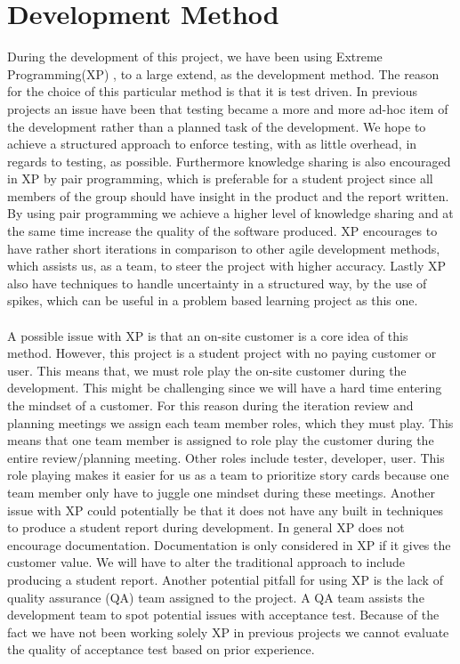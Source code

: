 
\section{Development Method}
\label{sec:development_method}

During the development of this project, we have been using Extreme Programming(XP) \parencite{xp}, to a large extend, as the development method. The reason for the choice of this particular method is that it is test driven. In previous projects an issue have been that testing became a more and more ad-hoc item of the development rather than a planned task of the development. We hope to achieve a structured approach to enforce testing, with as little overhead, in regards to testing, as possible. Furthermore knowledge sharing is also encouraged in XP by pair programming, which is preferable for a student project since all members of the group should have insight in the product and the report written. By using pair programming we achieve a higher level of knowledge sharing and at the same time increase the quality of the software produced. XP encourages to have rather short iterations in comparison to other agile development methods, which assists us, as a team, to steer the project with higher accuracy. Lastly XP also have techniques to handle uncertainty in a structured way, by the use of spikes, which can be useful in a problem based learning project as this one. 
\\\\
A possible issue with XP is that an on-site customer is a core idea of this method. However, this project is a student project with no paying customer or user. This means that, we must role play the on-site customer during the development. This might be challenging since we will have a hard time entering the mindset of a customer. For this reason during the iteration review and planning meetings we assign each team member roles, which they must play. This means that one team member is assigned to role play the customer during the entire review/planning meeting. Other roles include tester, developer, user. This role playing makes it easier for us as a team to prioritize story cards because one team member only have to juggle one mindset during these meetings. Another issue with XP could potentially be that it does not have any built in techniques to produce a student report during development. In general XP does not encourage documentation. Documentation is only considered in XP if it gives the customer value. We will have to alter the traditional approach to include producing a student report. Another potential pitfall for using XP is the lack of quality assurance (QA) team assigned to the project. A QA team assists the development team to spot potential issues with acceptance test. Because of the fact we have not been working solely XP in previous projects we cannot evaluate the quality of acceptance test based on prior experience.